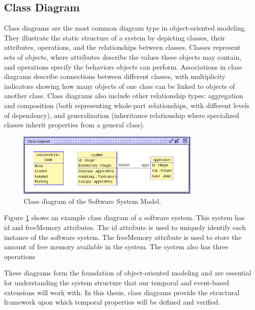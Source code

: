 \subsection{Class Diagram}
Class diagrams are the most common diagram type in object-oriented modeling. 
They illustrate the static structure of a system by depicting classes, their 
attributes, operations, and the relationships between classes. Classes 
represent sets of objects, where attributes describe the values these objects 
may contain, and operations specify the behaviors objects can perform.
Associations in class diagrams describe connections between different classes, 
with multiplicity indicators showing how many objects of one class can be linked 
to objects of another class. Class diagrams also include other relationship types: 
aggregation and composition (both representing whole-part relationships, with 
different levels of dependency), and generalization (inheritance relationship 
where specialized classes inherit properties from a general class).

\begin{figure}
    \begin{center}
        \includegraphics[width=0.8\textwidth]{figures/c1/Class_diagram.png}
        \caption{Class diagram of the Software System Model.}
        \label{fig:class_diagram_software_system_model}
    \end{center}
\end{figure}

Figure \ref{fig:class_diagram_software_system_model} shows an example class diagram
of a software system. This system has id and freeMemory attributes. The id attribute
is used to uniquely identify each instance of the software system. The freeMemory
attribute is used to store the amount of free memory available in the system. The
system also has three operations 

These diagrams form the foundation of object-oriented modeling and are essential 
for understanding the system structure that our temporal and event-based extensions 
will work with. In this thesis, class diagrams provide the structural framework 
upon which temporal properties will be defined and verified.

